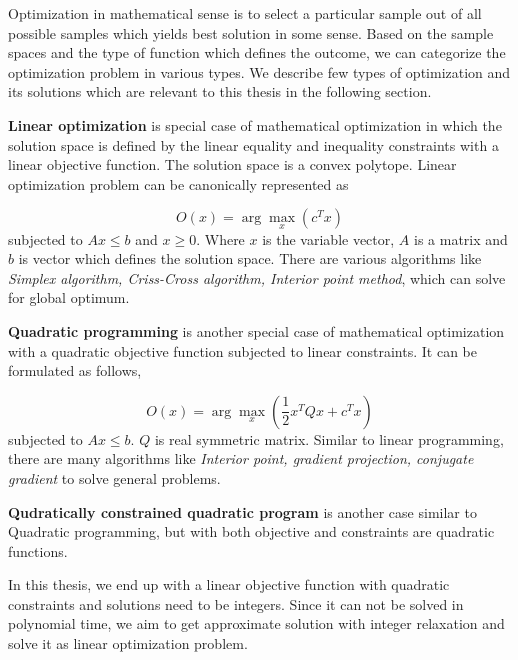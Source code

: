 
Optimization in mathematical sense is to select a particular sample out of all 
possible samples which yields best solution in some sense. Based on the sample
spaces and the type of function which defines the outcome, we can categorize the
optimization problem in various types. We describe few types of optimization and 
its solutions which are relevant to this thesis in the following section.

\textbf{Linear optimization} is special case of mathematical optimization in which the
solution space is defined by the linear equality and inequality constraints with
a linear objective function. The solution space is a convex polytope. Linear
optimization problem can be canonically represented as

\begin{equation}
O(x) = \arg\max_x(c^Tx)
\end{equation}
subjected to $Ax \leq b$ and $x \geq 0$. Where $x$ is the variable vector, $A$ is a
matrix and $b$ is vector which defines the solution space. There are various
algorithms like \textit{Simplex algorithm, Criss-Cross algorithm, Interior 
point method}, which can solve for global optimum.

\textbf{Quadratic programming} is another special case of mathematical optimization
with a quadratic objective function subjected to linear constraints. It can be
formulated as follows,

\begin{equation}
O(x) = \arg\max_x{(\frac{1}{2}x^TQx + c^Tx)}
\end{equation}
subjected to $Ax \leq b$. $Q$ is real symmetric matrix. Similar to linear programming,
there are many algorithms like \textit{Interior point, gradient projection, conjugate
gradient} to solve general problems.

\textbf{Qudratically constrained quadratic program} is another case similar to
Quadratic programming, but with both objective and constraints are quadratic functions.

In this thesis, we end up with a linear objective function with quadratic constraints
and solutions need to be integers. Since it can not be solved in polynomial time, we 
aim to get approximate solution with integer relaxation and solve it as linear 
optimization problem.
